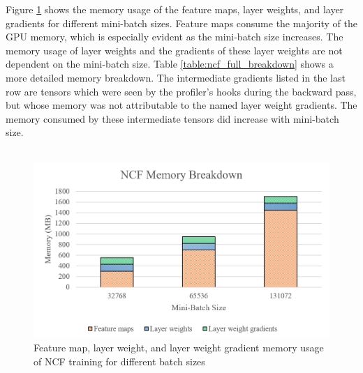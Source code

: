 \documentclass[12pt,letterpaper]{article}
\begin{document}
Figure \ref{fig:recommendation_bar_graph} shows the memory usage of the feature maps, layer weights, and layer gradients for different mini-batch sizes. Feature maps consume the majority of the GPU memory, which is especially evident as the mini-batch size increases. The memory usage of layer weights and the gradients of these layer weights are not dependent on the mini-batch size. Table \ref{table:ncf_full_breakdown} shows a more detailed memory breakdown. The intermediate gradients listed in the last row are tensors which were seen by the profiler's hooks during the backward pass, but whose memory was not attributable to the named layer weight gradients. The memory consumed by these intermediate tensors did increase with mini-batch size.
\\\\
\begin{figure}[H]
\centering
\includegraphics[width=1.0\textwidth]{recommendation_bar_graphs.PNG}
\captionsetup{width=0.8\linewidth}
\caption{Feature map, layer weight, and layer weight gradient memory usage of NCF training for different batch sizes}
\label{fig:recommendation_bar_graph}
\end{figure}
\end{document}
